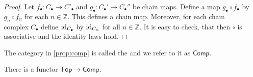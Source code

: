 \begin{proof}
	Let $f_\bullet : C_\bullet \to C'_\bullet$ and $g_\bullet : C_\bullet' \to C_\bullet''$ be chain maps. Define a map $g_\bullet \circ f_\bullet$ by $g_n \circ f_n$ for each $n \in \mathbb{Z}$. This defines a chain map. Moreover, for each chain complex $C_\bullet$ define $\operatorname{id}_{C_\bullet}$ by $\operatorname{id}_{C_n}$ for all $n \in \mathbb{Z}$. It is easy to check, that then $\circ$ is associative and the identity laws hold.
\end{proof}

\begin{definition}
	The category in \ref{prop:comp} is called the  and we refer to it as $\mathsf{Comp}$.
\end{definition}

\begin{theorem}
	There is a functor $\mathsf{Top} \to \mathsf{Comp}$.
	\label{thm:singular_complex}
\end{theorem}

